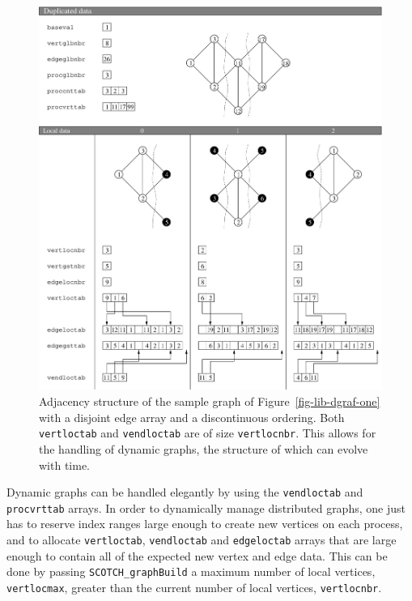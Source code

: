 \begin{figure}
\centering\includegraphics[scale=0.47]{p_f_gr2.eps}
\caption{Adjacency structure of the sample graph of
Figure~\protect\ref{fig-lib-dgraf-one} with a disjoint edge array and
a discontinuous ordering. Both {\tt vertloctab} and {\tt vendloctab}
are of size {\tt vertlocnbr}. This allows for the handling of dynamic
graphs, the structure of which can evolve with time.}
\label{fig-lib-dgraf-two}
\end{figure}

Dynamic graphs can be handled elegantly by using the
{\tt vend\lbt loc\lbt tab} and {\tt proc\lbt vrt\lbt tab} arrays.
In order to dynamically manage distributed graphs, one just has to
reserve index ranges large enough to create new vertices on each
process, and to allocate
{\tt vert\lbt loc\lbt tab}, {\tt vend\lbt loc\lbt tab} and
{\tt edge\lbt loc\lbt tab} arrays that are large
enough to contain all of the expected new vertex and edge
data. This can be done by passing {\tt SCOTCH\_\lbt graph\lbo Build} a
maximum number of local vertices, {\tt vert\lbt loc\lbt max}, greater
than the current number of local vertices, {\tt vert\lbt loc\lbt nbr}.

